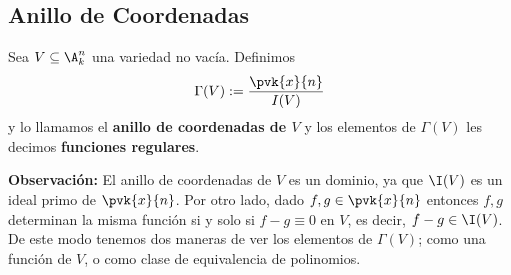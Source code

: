 \documentclass{article}
\begin{document}
\subsection{Anillo de Coordenadas}
\begin{dfn}
    Sea $V\subseteq\A_{k}^{n}$ una variedad no vacía. Definimos
    \begin{equation*}
        \Gamma(V):=\frac{\pvk{x}{n}}{I(V)}
    \end{equation*}
    y lo llamamos el \textbf{anillo de coordenadas de $V$} y los elementos de $\Gamma(V)$ les 
    decimos \textbf{funciones regulares}.
\end{dfn}
\noindent\textbf{Observación:} El anillo de coordenadas de $V$ es un dominio, ya que $\I(V)$ es un
ideal primo de $\pvk{x}{n}$. Por otro lado, dado $f,g\in\pvk{x}{n}$ entonces $f,g$ determinan la
misma función si y solo si $f-g\equiv0$ en $V$, es decir, $f-g\in\I(V)$. De este modo tenemos dos
maneras de ver los elementos de $\Gamma(V)$; como una función de $V$, o como clase de equivalencia 
de polinomios.
\end{document}
